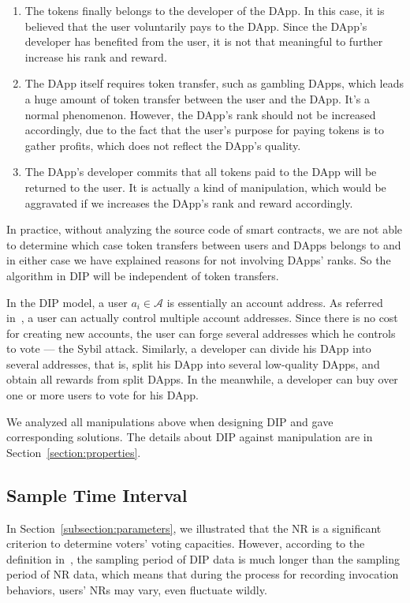   \begin{enumerate}
  	 \item The tokens finally belongs to the developer of the DApp. In this case, it is believed that the user voluntarily pays to the DApp. Since the DApp's developer has benefited from the user, it is not that meaningful to further increase his rank and reward.
  	\item The DApp itself requires token transfer, such as gambling DApps, which leads  a huge amount of token transfer between the user and the DApp. It's a normal phenomenon. However, the DApp's rank should not be increased accordingly, due to the fact that the user's purpose for paying tokens is to gather profits, which does not reflect the DApp's quality.
   \item The DApp's developer commits that all tokens paid to the DApp will be returned to the user. It is actually a kind of manipulation, which would be aggravated if we increases the DApp's rank and reward accordingly.
  \end{enumerate}
  In practice, without analyzing the source code of smart contracts, we are not able to determine which case token transfers between users and DApps belongs to and in either case we have explained reasons for not involving DApps' ranks. So the algorithm in DIP will be independent of token transfers.

  In the DIP model, a user $a_i \in \mathcal{A}$ is essentially an account
  address. As referred in~\cite{Nebulasyellowpaper}, a user can actually
  control multiple account addresses. Since there is no cost for creating new
  accounts, the user can forge several addresses which he controls to vote --- the Sybil attack. Similarly, a developer can divide his DApp into several addresses, that is, split his DApp into several low-quality DApps, and obtain all rewards from split DApps. In the meanwhile, a developer can buy over one or more users to vote for his DApp.

  We analyzed all manipulations above when designing DIP and gave corresponding solutions. The details about DIP against manipulation are in Section~\ref{section:properties}.

  \subsection{Sample Time Interval}
  \label{subsection:interval}
  \noindent
  In Section~\ref{subsection:parameters}, we illustrated that the NR is a significant criterion to determine voters' voting capacities. However, according to the definition in~\cite{Nebulasyellowpaper}, the sampling period of DIP data is much longer than the sampling period of NR data, which means that during the process for recording invocation behaviors, users' NRs may vary, even fluctuate wildly.

